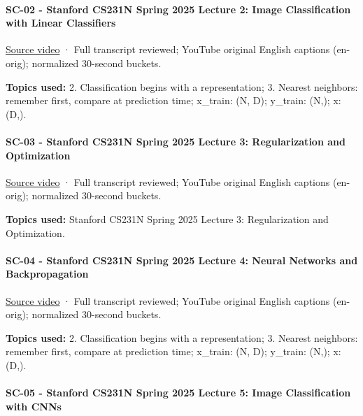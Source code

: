 \paragraph{SC-02 - Stanford CS231N Spring 2025 Lecture 2: Image Classification with Linear Classifiers}\label{sc-02---stanford-cs231n-spring-2025-lecture-2-image-classification-with-linear-classifiers}

\href{https://www.youtube.com/watch?v=pdqofxJeBN8}{Source video} · Full transcript reviewed; YouTube original English captions (en-orig); normalized 30-second buckets.

\textbf{Topics used:} 2. Classification begins with a representation; 3. Nearest neighbors: remember first, compare at prediction time; x\_train: (N, D); y\_train: (N,); x: (D,).

\paragraph{SC-03 - Stanford CS231N Spring 2025 Lecture 3: Regularization and Optimization}\label{sc-03---stanford-cs231n-spring-2025-lecture-3-regularization-and-optimization}

\href{https://www.youtube.com/watch?v=dyNGd06MWn4}{Source video} · Full transcript reviewed; YouTube original English captions (en-orig); normalized 30-second buckets.

\textbf{Topics used:} Stanford CS231N \textbar{} Spring 2025 \textbar{} Lecture 3: Regularization and Optimization.

\paragraph{SC-04 - Stanford CS231N Spring 2025 Lecture 4: Neural Networks and Backpropagation}\label{sc-04---stanford-cs231n-spring-2025-lecture-4-neural-networks-and-backpropagation}

\href{https://www.youtube.com/watch?v=25zD5qJHYsk}{Source video} · Full transcript reviewed; YouTube original English captions (en-orig); normalized 30-second buckets.

\textbf{Topics used:} 2. Classification begins with a representation; 3. Nearest neighbors: remember first, compare at prediction time; x\_train: (N, D); y\_train: (N,); x: (D,).

\paragraph{SC-05 - Stanford CS231N Spring 2025 Lecture 5: Image Classification with CNNs}\label{sc-05---stanford-cs231n-spring-2025-lecture-5-image-classification-with-cnns}

